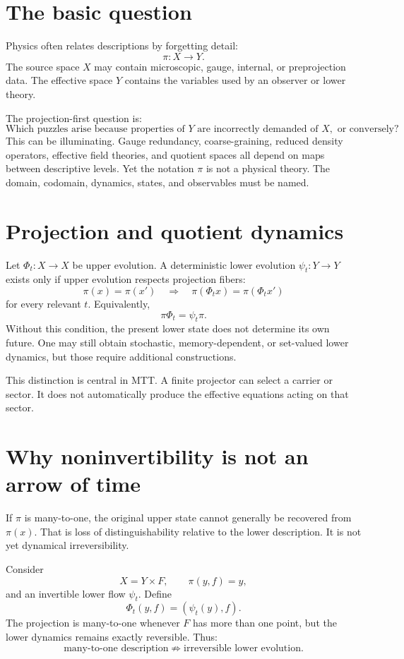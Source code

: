 \documentclass[11pt]{article}
\begin{document}
\tableofcontents

\section{The basic question}

Physics often relates descriptions by forgetting detail:
\[
 \pi:X\longrightarrow Y.
\]
The source space \(X\) may contain microscopic, gauge, internal, or
preprojection data. The effective space \(Y\) contains the variables used by
an observer or lower theory.

The projection-first question is:
\[
\text{Which puzzles arise because properties of }Y
\text{ are incorrectly demanded of }X,\text{ or conversely?}
\]
This can be illuminating. Gauge redundancy, coarse-graining, reduced
density operators, effective field theories, and quotient spaces all depend
on maps between descriptive levels. Yet the notation \(\pi\) is not a
physical theory. The domain, codomain, dynamics, states, and observables must
be named.

\section{Projection and quotient dynamics}

Let \(\Phi_t:X\to X\) be upper evolution. A deterministic lower evolution
\(\psi_t:Y\to Y\) exists only if upper evolution respects projection fibers:
\[
 \pi(x)=\pi(x')
 \quad\Longrightarrow\quad
 \pi(\Phi_t x)=\pi(\Phi_t x')
\]
for every relevant \(t\). Equivalently,
\[
 \pi\Phi_t=\psi_t\pi.
\]
Without this condition, the present lower state does not determine its own
future. One may still obtain stochastic, memory-dependent, or set-valued
lower dynamics, but those require additional constructions.

This distinction is central in MTT. A finite projector can select a carrier
or sector. It does not automatically produce the effective equations acting
on that sector.

\section{Why noninvertibility is not an arrow of time}

If \(\pi\) is many-to-one, the original upper state cannot generally be
recovered from \(\pi(x)\). That is loss of distinguishability relative to
the lower description. It is not yet dynamical irreversibility.

Consider
\[
 X=Y\times F,\qquad
 \pi(y,f)=y,
\]
and an invertible lower flow \(\psi_t\). Define
\[
 \Phi_t(y,f)=(\psi_t(y),f).
\]
The projection is many-to-one whenever \(F\) has more than one point, but
the lower dynamics remains exactly reversible. Thus:
\[
\text{many-to-one description}
\not\Rightarrow
\text{irreversible lower evolution}.
\]
\end{document}
